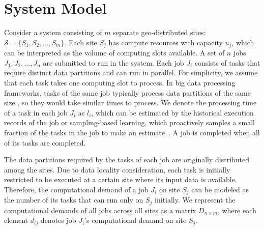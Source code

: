 \section{System Model}
\label{sec4:model}
Consider a system consisting of $m$ separate geo-distributed sites: $\mathcal{S} = \{S_1, \allowbreak S_2, \allowbreak ..., \allowbreak S_m\}$. Each site $S_j$ has compute resources with capacity $u_j$, which can be interpreted as the volume of computing slots available. A set of $n$ jobs $J_1, J_2, ..., J_n$ are submitted to run in the system. Each job $J_i$ consists of tasks that require distinct data partitions and can run in parallel. For simplicity, we assume that each task takes one computing slot to process. In big data processing frameworks, tasks of the same job typically process data partitions of the same size \cite{shvachko2010hadoop, shanahan2015large_spark}, so they would take similar times to process. We denote the processing time of a task in each job $J_i$ as $l_i$, which can be estimated by the historical execution records of the job or sampling-based learning, which proactively samples a small fraction of the tasks in the job to make an estimate~\cite{jajoo2022slearn}.
A job is completed when all of its tasks are completed.

The data partitions required by the tasks of each job are originally distributed among the sites. Due to data locality consideration, each task is initially restricted to be executed at a certain site where its input data is available. Therefore, the computational demand of a job $J_i$ on site $S_j$ can be modeled as the number of its tasks that can run only on $S_j$ initially. We represent the computational demands of all jobs across all sites as a matrix $D_{n \times m}$, where each element $d_{ij}$ denotes job $J_i$'s computational demand on site $S_j$.%

